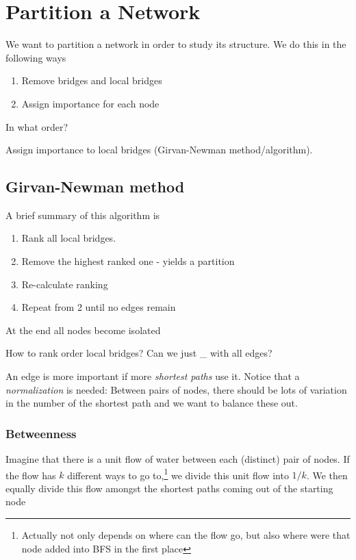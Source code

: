\chapter{Partition a Network}
We want to partition a network in order to study its structure. We do this in the following ways
\begin{enumerate}
	\item Remove bridges and local bridges
	\item Assign importance for each node
\end{enumerate}

\begin{problem}
In what order?
\end{problem}
\begin{answer}
	Assign importance to local bridges (Girvan-Newman method/algorithm).
\end{answer}

\section{Girvan-Newman method}
\begin{intuition}
	A brief summary of this algorithm is
	\begin{enumerate}
		\item Rank all local bridges.
		\item Remove the highest ranked one - yields a partition
		\item Re-calculate ranking
		\item Repeat from 2 until no edges remain
	\end{enumerate}
\end{intuition}

At the end all nodes become isolated

\begin{problem}
How to rank order local bridges? Can we just \_ with all edges?
\end{problem}

\begin{intuition}
	An edge is more important if more \emph{shortest paths} use it. Notice that a \emph{normalization} is needed:
	Between pairs of nodes, there should be lots of variation in the number of the shortest path and we want to balance these out.
\end{intuition}

\subsection{Betweenness}
\begin{definition}[Betweenness]
	Imagine that there is a unit flow of water between each (distinct) pair of nodes. If the flow has $k$ different ways to go to,\footnote{Actually not only depends on where can the flow go, but also where were that node added into BFS in the first place}
	we divide this unit flow into $1/k$. We then equally divide this flow amongst the shortest paths coming out of the starting node
\end{definition}


